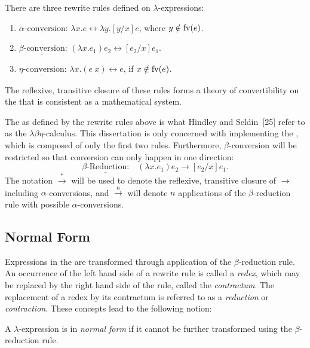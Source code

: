 There are three rewrite rules defined on \(\lambda\)-expressions:

\begin{enumerate}
\item \(\underline{\alpha\text{-conversion}}\):
  \(\lambda x.e \longleftrightarrow \lambda y.[y/x]e\), where \(y \notin \operatorname{fv}(e)\).
\item \(\underline{\beta\text{-conversion}}\):
  \((\lambda x.e_1)e_2 \longleftrightarrow [e_2/x]e_1\).
\item \(\underline{\eta\text{-conversion}}\):
  \(\lambda x.(e\ x) \longleftrightarrow e\), if \(x \notin \operatorname{fv}(e)\).
\end{enumerate}

The reflexive, transitive closure of these rules forms a theory of
convertibility on the \lambdacalculus{} that is consistent as a mathematical
system.

The \lambdacalculus{} as defined by the rewrite rules above is what Hindley and
Seldin~[25] refer to as the \(\lambda\beta\eta\)-calculus. This dissertation is
only concerned with implementing the \lambdabetacalculus, which is composed of
only the first two rules. Furthermore, \(\beta\)-conversion will be restricted
so that conversion can only happen in one direction:
\[
\underline{\beta\text{-Reduction:}}\quad
(\lambda x.e_1)e_2 \longrightarrow [e_2/x]e_1 .
\]
The notation \(\overset{*}{\longrightarrow}\) will be used to denote the reflexive,
transitive closure of \(\longrightarrow\) including \(\alpha\)-conversions, and
\(\overset{n}{\longrightarrow}\) will denote \(n\) applications of the
\(\beta\)-reduction rule with possible \(\alpha\)-conversions.

\subsection{Normal Form}

Expressions in the \lambdabetacalculus{} are transformed through application of
the \(\beta\)-reduction rule. An occurrence of the left hand side of a rewrite
rule is called a \emph{redex}, which may be replaced by the right hand side of
the rule, called the \emph{contractum}. The replacement of a redex by its
contractum is referred to as a \emph{reduction} or \emph{contraction}. These
concepts lead to the following notion:

\begin{definition}
A \(\lambda\)-expression is in \emph{normal form} if it cannot be further
transformed using the \(\beta\)-reduction rule.
\end{definition}

